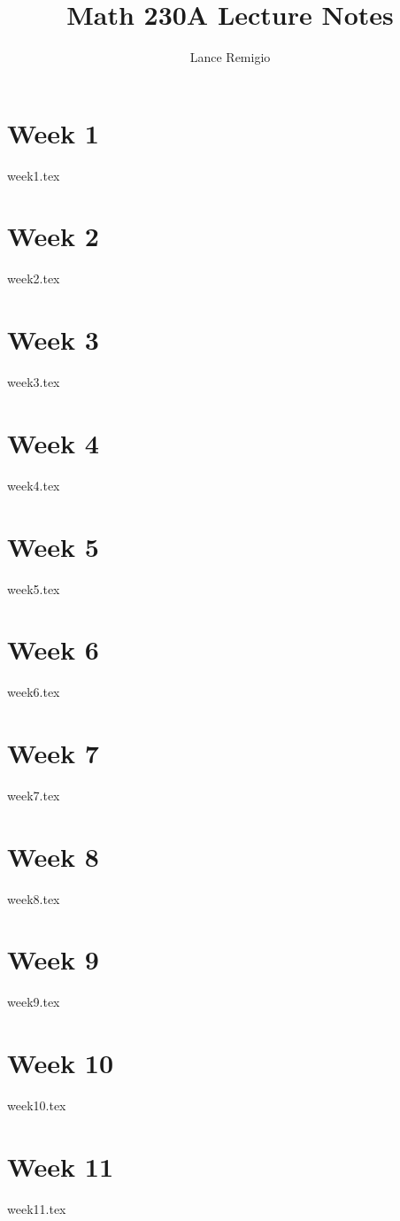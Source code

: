 \documentclass{report}
\title{Math 230A Lecture Notes}
\author{Lance Remigio}
\begin{document}
\maketitle 
\tableofcontents


\chapter{Week 1}

{week1.tex}

\chapter{Week 2}

{week2.tex}

\chapter{Week 3}

{week3.tex}

\chapter{Week 4}

{week4.tex}

\chapter{Week 5}

{week5.tex}

\chapter{Week 6}

{week6.tex}

\chapter{Week 7}

{week7.tex}

\chapter{Week 8}

{week8.tex}

\chapter{Week 9}

{week9.tex}

\chapter{Week 10}

{week10.tex}

\chapter{Week 11}

{week11.tex}
\end{document}
